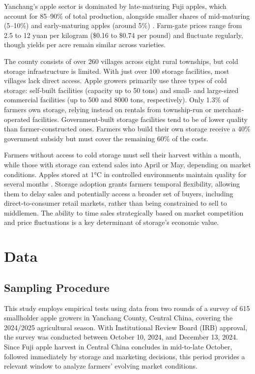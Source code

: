 Yanchang's apple sector is dominated by late-maturing Fuji apples, which account for 85–90\% of total production, alongside smaller shares of mid-maturing (5–10\%) and early-maturing apples (around 5\%) \citep{yanchang2023}. Farm-gate prices range from 2.5 to 12 yuan per kilogram (\$0.16 to \$0.74 per pound) and fluctuate regularly, though yields per acre remain similar across varieties.  

The county consists of over 260 villages across eight rural townships, but cold storage infrastructure is limited. With just over 100 storage facilities, most villages lack direct access. Apple growers primarily use three types of cold storage: self-built facilities (capacity up to 50 tons) and small- and large-sized commercial facilities (up to 500 and 8000 tons, respectively). Only 1.3\% of farmers own storage, relying instead on rentals from township-run or merchant-operated facilities. Government-built storage facilities tend to be of lower quality than farmer-constructed ones. Farmers who build their own storage receive a 40\% government subsidy but must cover the remaining 60\% of the costs.  

Farmers without access to cold storage must sell their harvest within a month, while those with storage can extend sales into April or May, depending on market conditions. Apples stored at 1°C in controlled environments maintain quality for several months \citep{Varela2005Shelf-life, Echeverría2004Relationships}. Storage adoption grants farmers temporal flexibility, allowing them to delay sales and potentially access a broader set of buyers, including direct-to-consumer retail markets, rather than being constrained to sell to middlemen. The ability to time sales strategically based on market competition and price fluctuations is a key determinant of storage's economic value.  



\section{Data}
\subsection{Sampling Procedure}
\noindent This study employs empirical tests using data from two rounds of a survey of 615 smallholder apple growers in Yanchang County, Central China, covering the 2024/2025 agricultural season. With Institutional Review Board (IRB) approval, the survey was conducted between October 10, 2024, and December 13, 2024. Since Fuji apple harvest in Central China concludes in mid-to-late October, followed immediately by storage and marketing decisions, this period provides a relevant window to analyze farmers' evolving market conditions.  

